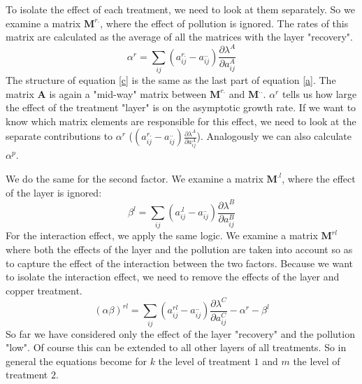 \documentclass{article}\usepackage[]{graphicx}\usepackage[]{color}
\begin{document}
To isolate the effect of each treatment, we need to look at them separately. So we examine a matrix $\boldsymbol{M}^{r.}$, where the effect of pollution is ignored. The rates of this matrix are calculated as the average of all the matrices with the layer "recovery". 
\begin{equation}\label{c}
\alpha^{r}=\sum_{ij}(a^{r.}_{ij}-a^{..}_{ij}) \frac{\partial\lambda^{A}}{\partial a^{A}_{ij}}
\end{equation}
The structure of equation \ref{c} is the same as the last part of equation \ref{a}. The matrix $\boldsymbol{A}$ is again a "mid-way" matrix between $\boldsymbol{M}^{r.}$ and $\boldsymbol{M}^{..}$. $\alpha^{r}$ tells us how large the effect of the treatment "layer" is on the asymptotic growth rate. If we want to know which matrix elements are responsible for this effect, we need to look at the separate contributions to $\alpha^r$ ($(a^{r.}_{ij}-a^{..}_{ij}) \frac{\partial\lambda^{A}}{\partial a^{A}_{ij}}$). Analogously we can also calculate $\alpha^p$.

We do the same for the second factor. We examine a matrix $\boldsymbol{M}^{.l}$, where the effect of the layer is ignored: 
\begin{equation}\label{d}
\beta^{l}=\sum_{ij}(a^{.l}_{ij}-a^{..}_{ij}) \frac{\partial\lambda^{B}}{\partial a^{B}_{ij}}
\end{equation}
For the interaction effect, we apply the same logic. We examine a matrix $\boldsymbol{M}^{rl}$ where both the effects of the layer and the pollution are taken into account so as to capture the effect of the interaction between the two factors. Because we want to isolate the interaction effect, we need to remove the effects of the layer and copper treatment.
\begin{equation}
(\alpha \beta)^{rl}=\sum_{ij}(a^{rl}_{ij}-a^{..}_{ij}) \frac{\partial\lambda^{C}}{\partial a^{C}_{ij}} -\alpha^{r}-\beta^{l}
\end{equation}
So far we have considered only the effect of the layer "recovery" and the pollution "low". Of course this can be extended to all other layers of all treatments. So in general the equations become for $k$ the level of treatment $1$ and $m$ the level of treatment $2$.
\end{document}
